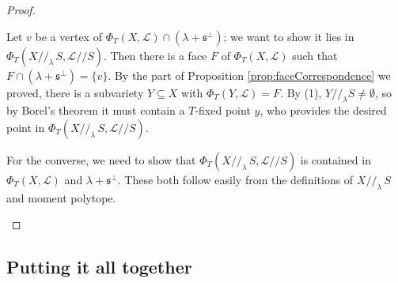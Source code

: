\documentclass[10pt,a4paper]{amsart}
\newcommand\lie[1]{{\mathfrak #1}}
\newcommand\calL{{\mathcal L}}
\begin{document}
\begin{proof}
\begin{enumerate}
    Let $v$ be a vertex of $\Phi_T(X,\calL) \cap (\lambda+\lie s^\perp)$;
    we want to show it lies in $\Phi_T(X//_\lambda\, S,\calL//S)$.
    Then there is a face $F$ of $\Phi_T(X,\calL)$ such that
    $F \cap (\lambda+\lie s^\perp) = \{v\}$.
    By the part of Proposition \ref{prop:faceCorrespondence} we proved,
    there is a subvariety $Y \subseteq X$ with $\Phi_T(Y,\calL) = F$.
    By (1), $Y//_\lambda S \neq \emptyset$, so by Borel's theorem
    it must contain a $T$-fixed point $y$, who provides the desired point
    in $\Phi_T(X//_\lambda\, S,\calL//S)$.

    For the converse, we need to show that
    $\Phi_T(X//_\lambda\, S,\calL//S)$ is contained in
    $\Phi_T(X, \calL)$ and $\lambda + \lie s^\perp$. These both follow
    easily from the definitions of $X//_\lambda\, S$ and moment polytope.
    \qedhere
  \end{enumerate}
\end{proof}

\subsection{Putting it all together}
\end{document}
